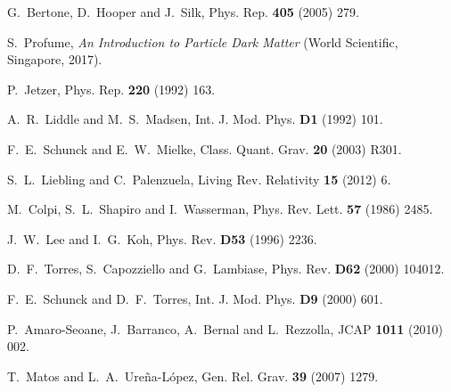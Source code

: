 \documentclass[
aps,prd,
12pt,%
nopreprintnumbers,
showpacs,
eqsecnum,
nofootinbib
]{revtex4-1}
\begin{document}
%

%
\begin{thebibliography}{99}

G.~Bertone, D.~Hooper and J.~Silk,
Phys. Rep. \textbf{405} (2005) 279.%

S.~Profume, \textit{An Introduction to Particle Dark Matter}
(World Scientific, Singapore, 2017).

 P.~Jetzer, 
Phys. Rep. {\bf 220} (1992) 163.%

 A.~R.~Liddle and M.~S.~Madsen, 
Int. J. Mod. Phys. {\bf D1} (1992) 101.%

 F.~E.~Schunck and E.~W.~Mielke, 
Class. Quant. Grav. {\bf 20} (2003) R301.

 S.~L.~Liebling and C.~Palenzuela, 
Living Rev. Relativity {\bf 15} (2012) 6.

 M.~Colpi, S.~L.~Shapiro and I.~Wasserman, 
Phys. Rev. Lett. {\bf 57} (1986) 2485.%

 J.~W.~Lee and I.~G.~Koh,
Phys. Rev. {\bf D53} (1996) 2236.

 D.~F.~Torres, S.~Capozziello and G.~Lambiase,
Phys. Rev. {\bf D62} (2000) 104012.

 F.~E.~Schunck and D.~F.~Torres,
Int. J. Mod. Phys. {\bf D9} (2000) 601.

P.~Amaro-Seoane, J.~Barranco, A.~Bernal and L.~Rezzolla,
JCAP {\bf 1011} (2010) 002.

T.~Matos and L.~A.~Ure\~na-L\'opez, 
Gen. Rel. Grav. {\bf 39} (2007) 1279.%


\end{thebibliography}
\end{document}
